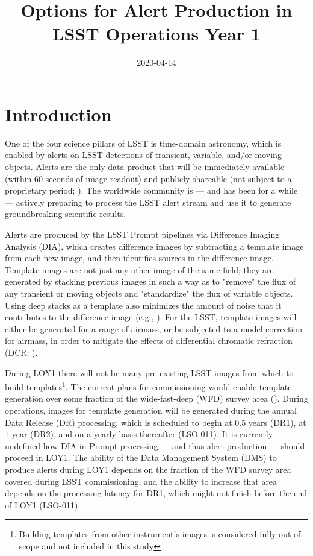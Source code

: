 \documentclass[DM,toc]{lsstdoc}
\title[Alert Production in Year 1]{Options for Alert Production in \\ LSST Operations Year 1}
\date{2020-04-14}
\begin{document}
\maketitle

\section{Introduction} \label{sec:intro}

One of the four science pillars of LSST is time-domain astronomy, which is enabled by alerts on LSST detections of transient, variable, and/or moving objects. Alerts are the only data product that will be immediately available (within $60$ seconds of image readout) and publicly shareable (not subject to a proprietary period; ).
The worldwide community is --- and has been for a while --- actively preparing to process the LSST alert stream and use it to generate groundbreaking scientific results.

Alerts are produced by the LSST Prompt pipelines via Difference Imaging Analysis (DIA), which creates difference images by subtracting a template image from each new image, and then identifies sources in the difference image.
Template images are not just any other image of the same field; they are generated by stacking previous images in such a way as to "remove" the flux of any transient or moving objects and "standardize" the flux of variable objects.
Using deep stacks as a template also minimizes the amount of noise that it contributes to the difference image (e.g., ).
For the LSST, template images will either be generated for a range of airmass, or be subjected to a model correction for airmass, in order to mitigate the effects of differential chromatic refraction (DCR; ).

During LOY1 there will not be many pre-existing LSST images from which to build templates\footnote{Building templates from other instrument's images is considered fully out of scope and not included in this study}.
The current plans for commissioning would enable template generation over some fraction of the wide-fast-deep (WFD) survey area ().
During operations, images for template generation will be generated during the annual Data Release (DR) processing, which is scheduled to begin at $0.5$ years (DR1), at $1$ year (DR2), and on a yearly basis thereafter (LSO-011).
It is currently undefined how DIA in Prompt processing --- and thus alert production --- should proceed in LOY1.
The ability of the Data Management System (DMS) to produce alerts during LOY1 depends on the fraction of the WFD survey area covered during LSST commissioning, and the ability to increase that area depends on the processing latency for DR1, which might not finish before the end of LOY1 (LSO-011).
\end{document}

